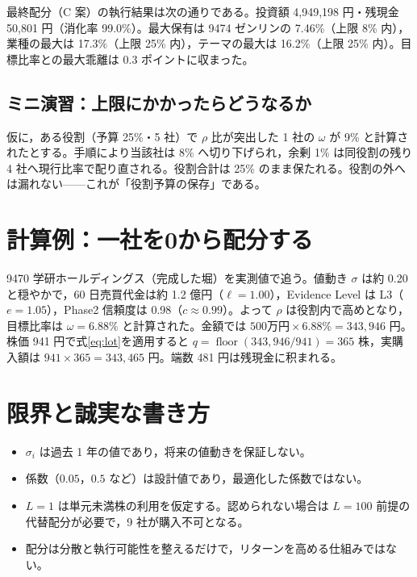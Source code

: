 \documentclass[a4paper,10pt]{article}
\begin{document}
最終配分（C 案）の執行結果は次の通りである。投資額 4{,}949{,}198 円・残現金 50{,}801 円（消化率 99.0\%）。最大保有は 9474 ゼンリンの 7.46\%（上限 8\% 内），業種の最大は 17.3\%（上限 25\% 内），テーマの最大は 16.2\%（上限 25\% 内）。目標比率との最大乖離は 0.3 ポイントに収まった。

\subsection{ミニ演習：上限にかかったらどうなるか}

仮に，ある役割（予算 25\%・5 社）で $\rho$ 比が突出した 1 社の $\omega$ が 9\% と計算されたとする。手順により当該社は 8\% へ切り下げられ，余剰 1\% は同役割の残り 4 社へ現行比率で配り直される。役割合計は 25\% のまま保たれる。役割の外へは漏れない——これが「役割予算の保存」である。

\section{計算例：一社を0から配分する}
\label{sec:example}

9470 学研ホールディングス（完成した堀）を実測値で追う。値動き $\sigma$ は約 0.20 と穏やかで，60 日売買代金は約 1.2 億円（$\ell=1.00$），Evidence Level は L3（$e=1.05$），Phase2 信頼度は 0.98（$c\approx0.99$）。よって $\rho$ は役割内で高めとなり，目標比率は $\omega=6.88\%$ と計算された。金額では $500\text{万円}\times6.88\%=343{,}946$ 円。株価 941 円で式\eqref{eq:lot}を適用すると $q=\operatorname{floor}(343{,}946/941)=365$ 株，実購入額は $941\times365=343{,}465$ 円。端数 481 円は残現金に积まれる。

\section{限界と誠実な書き方}
\label{sec:limits}

\begin{itemize}
\item $\sigma_i$ は過去 1 年の値であり，将来の値動きを保証しない。
\item 係数（$0.05$，$0.5$ など）は設計値であり，最適化した係数ではない。
\item $L=1$ は単元未満株の利用を仮定する。認められない場合は $L=100$ 前提の代替配分が必要で，9 社が購入不可となる。
\item 配分は分散と執行可能性を整えるだけで，リターンを高める仕組みではない。
\end{itemize}
\end{document}
